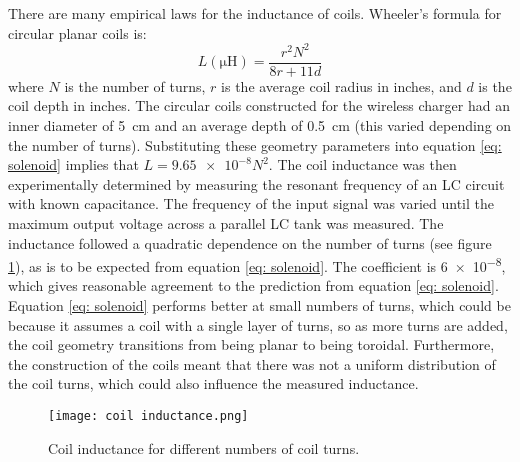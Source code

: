 There are many empirical laws for the inductance of coils. Wheeler's formula \cite{Wheeler} for circular planar coils is:
\begin{equation}\label{eq: solenoid}
L (\si{\micro\henry})= \frac{r^2N^2}{8r + 11d}
\end{equation}
where $N$ is the number of turns, $r$ is the average coil radius in inches, and $d$ is the coil depth in inches. The circular coils constructed for the wireless charger had an inner diameter of \SI{5}{\centi\metre} and an average depth of \SI{0.5}{\centi\metre} (this varied depending on the number of turns). Substituting these geometry parameters into equation \ref{eq: solenoid} implies that $L=\num{9.65e-8}N^2$. The coil inductance was then experimentally determined by measuring the resonant frequency of an LC circuit with known capacitance. The frequency of the input signal was varied until the maximum output voltage across a parallel LC tank was measured. The inductance followed a quadratic dependence on the number of turns (see figure \ref{fig: coil inductance}), as is to be expected from equation \ref{eq: solenoid}. The coefficient is \num{6e-8}, which gives reasonable agreement to the prediction from equation \ref{eq: solenoid}. Equation \ref{eq: solenoid} performs better at small numbers of turns, which could be because it assumes a coil with a single layer of turns, so as more turns are added, the coil geometry transitions from being planar to being toroidal. Furthermore, the construction of the coils meant that there was not a uniform distribution of the coil turns, which could also influence the measured inductance.\\

\begin{figure}[ht]
	\centering
	\texttt{[image: coil inductance.png]}
	\caption{Coil inductance for different numbers of coil turns.}
	\label{fig: coil inductance}
\end{figure}

